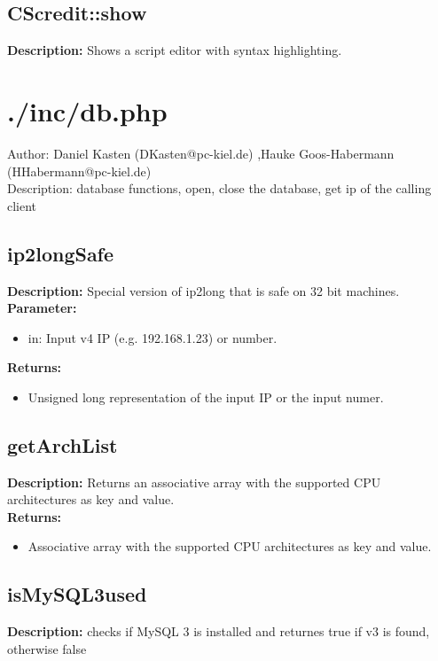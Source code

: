 \subsection{CScredit::show}
\textbf{Description:} Shows a script editor with syntax highlighting.\\

\newpage\section{./inc/db.php}
 Author: Daniel Kasten (DKasten@pc-kiel.de) ,Hauke Goos-Habermann (HHabermann@pc-kiel.de)\\
 Description: database functions, open, close the database, get ip of the calling client\\

\subsection{ip2longSafe}
\textbf{Description:} Special version of ip2long that is safe on 32 bit machines.\\
\textbf{Parameter:}
\begin{itemize}
\item in: Input v4 IP (e.g. 192.168.1.23) or number.
\end{itemize}
\textbf{Returns:}
\begin{itemize}
\item Unsigned long representation of the input IP or the input numer.
\end{itemize}

\subsection{getArchList}
\textbf{Description:} Returns an associative array with the supported CPU architectures as key and value.\\
\textbf{Returns:}
\begin{itemize}
\item Associative array with the supported CPU architectures as key and value.
\end{itemize}

\subsection{isMySQL3used}
\textbf{Description:} checks if MySQL 3 is installed and returnes true if v3 is found, otherwise false\\

